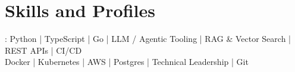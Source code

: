 \documentclass[print]{jack-resume}
\begin{document}
\pagecolor{darkmodeBackground}

%
%



%
%
\begin{minipage}[t][1cm][t]{.03\textwidth}
    \hfill
\end{minipage}






\section{Skills and Profiles}
:
Python \hfill | \hfill
TypeScript \hfill | \hfill
Go \hfill | \hfill
LLM / Agentic Tooling \hfill | \hfill
RAG \& Vector Search \hfill | \hfill
REST APIs \hfill | \hfill
CI/CD \\
\hspace{1.0cm} Docker \hfill | \hfill
Kubernetes \hfill | \hfill
AWS \hfill | \hfill
Postgres \hfill | \hfill
Technical Leadership \hfill | \hfill
Git \\
\end{document}
